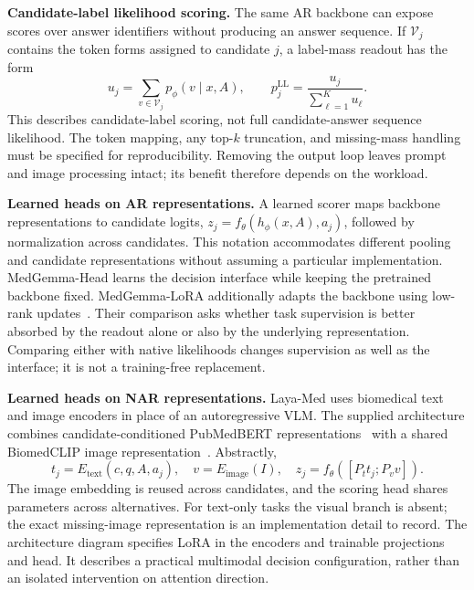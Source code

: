 \textbf{Candidate-label likelihood scoring.} The same AR backbone can expose scores over answer identifiers without producing an answer sequence. If $\mathcal V_j$ contains the token forms assigned to candidate $j$, a label-mass readout has the form
\begin{equation}
 u_j=\sum_{v\in\mathcal V_j}p_\phi(v\mid x,A),\qquad
 p_j^{\mathrm{LL}}=\frac{u_j}{\sum_{\ell=1}^{K}u_\ell}.
\label{eq:ll}
\end{equation}
This describes candidate-label scoring, not full candidate-answer sequence likelihood. The token mapping, any top-$k$ truncation, and missing-mass handling must be specified for reproducibility. Removing the output loop leaves prompt and image processing intact; its benefit therefore depends on the workload.

\textbf{Learned heads on AR representations.} A learned scorer maps backbone representations to candidate logits, $z_j=f_\theta(h_\phi(x,A),a_j)$, followed by normalization across candidates. This notation accommodates different pooling and candidate representations without assuming a particular implementation. MedGemma-Head learns the decision interface while keeping the pretrained backbone fixed. MedGemma-LoRA additionally adapts the backbone using low-rank updates~\cite{lora}. Their comparison asks whether task supervision is better absorbed by the readout alone or also by the underlying representation. Comparing either with native likelihoods changes supervision as well as the interface; it is not a training-free replacement.

\textbf{Learned heads on NAR representations.} Laya-Med uses biomedical text and image encoders in place of an autoregressive VLM. The supplied architecture combines candidate-conditioned PubMedBERT representations~\cite{pubmedbert} with a shared BiomedCLIP image representation~\cite{biomedclip}. Abstractly,
\begin{equation}
 t_j=E_{\mathrm{text}}(c,q,A,a_j),\quad
 v=E_{\mathrm{image}}(I),\quad
 z_j=f_\theta([P_t t_j;P_v v]).
\label{eq:laya}
\end{equation}
The image embedding is reused across candidates, and the scoring head shares parameters across alternatives. For text-only tasks the visual branch is absent; the exact missing-image representation is an implementation detail to record. The architecture diagram specifies LoRA in the encoders and trainable projections and head. It describes a practical multimodal decision configuration, rather than an isolated intervention on attention direction.

